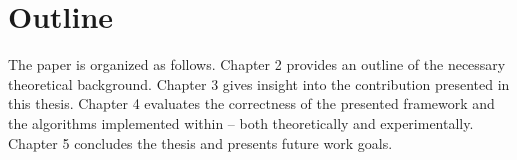 \section{Outline}

The paper is organized as follows. Chapter 2 provides an outline of the necessary theoretical background. Chapter 3 gives insight into the contribution presented in this thesis. Chapter 4 evaluates the correctness of the presented framework and the algorithms implemented within -- both theoretically and experimentally. Chapter 5 concludes the thesis and presents future work goals.
